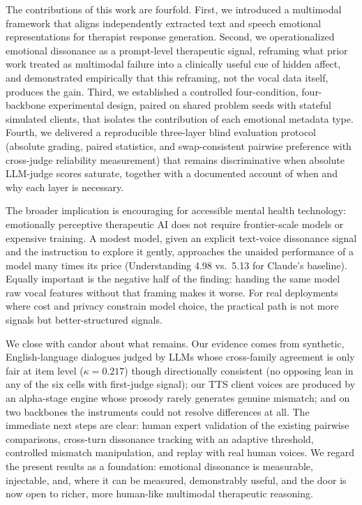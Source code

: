 The contributions of this work are fourfold. First, we introduced a multimodal framework that aligns independently extracted text and speech emotional representations for therapist response generation. Second, we operationalized emotional dissonance as a prompt-level therapeutic signal, reframing what prior work treated as multimodal failure into a clinically useful cue of hidden affect, and demonstrated empirically that this reframing, not the vocal data itself, produces the gain. Third, we established a controlled four-condition, four-backbone experimental design, paired on shared problem seeds with stateful simulated clients, that isolates the contribution of each emotional metadata type. Fourth, we delivered a reproducible three-layer blind evaluation protocol (absolute grading, paired statistics, and swap-consistent pairwise preference with cross-judge reliability measurement) that remains discriminative when absolute LLM-judge scores saturate, together with a documented account of when and why each layer is necessary.

The broader implication is encouraging for accessible mental health technology: emotionally perceptive therapeutic AI does not require frontier-scale models or expensive training. A modest model, given an explicit text-voice dissonance signal and the instruction to explore it gently, approaches the unaided performance of a model many times its price (Understanding 4.98 vs.\ 5.13 for Claude's baseline). Equally important is the negative half of the finding: handing the same model raw vocal features without that framing makes it worse. For real deployments where cost and privacy constrain model choice, the practical path is not more signals but better-structured signals.

We close with candor about what remains. Our evidence comes from synthetic, English-language dialogues judged by LLMs whose cross-family agreement is only fair at item level ($\kappa = 0.217$) though directionally consistent (no opposing lean in any of the six cells with first-judge signal); our TTS client voices are produced by an alpha-stage engine whose prosody rarely generates genuine mismatch; and on two backbones the instruments could not resolve differences at all. The immediate next steps are clear: human expert validation of the existing pairwise comparisons, cross-turn dissonance tracking with an adaptive threshold, controlled mismatch manipulation, and replay with real human voices. We regard the present results as a foundation: emotional dissonance is measurable, injectable, and, where it can be measured, demonstrably useful, and the door is now open to richer, more human-like multimodal therapeutic reasoning.
